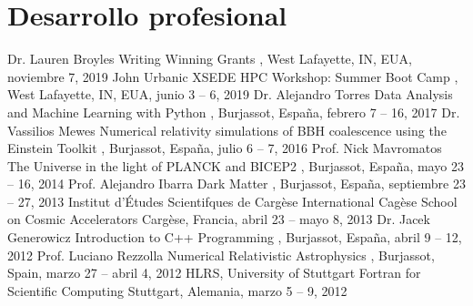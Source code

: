 \section{Desarrollo profesional}

%
{Dr. Lauren Broyles}%
{Writing Winning Grants}%
{}%
{\Purdue, West Lafayette, IN, EUA, noviembre 7, 2019}%
{}
%
{John Urbanic}%
{XSEDE HPC Workshop: Summer Boot Camp}%
{}%
{\Purdue, West Lafayette, IN, EUA, junio 3 -- 6, 2019}%
{}
%
{Dr. Alejandro Torres}%
{Data Analysis and Machine Learning with Python}%
{}%
{\UVval, Burjassot, España, febrero 7 -- 16, 2017}%
{}
%
{Dr. Vassilios Mewes}%
{Numerical relativity simulations of BBH coalescence using the Einstein Toolkit}%
{}%
{\UVval, Burjassot, España, julio 6 -- 7, 2016}%
{}
%
{Prof. Nick Mavromatos}%
{The Universe in the light of PLANCK and BICEP2}%
{}%
{\UVval, Burjassot, España, mayo 23 -- 16, 2014}%
{}
%
{Prof. Alejandro Ibarra}%
{Dark Matter}%
{}%
{\UVval, Burjassot, España, septiembre 23 -- 27, 2013}
{}
%
{Institut d'Études Scientifques de Cargèse}%
{International Cagèse School on Cosmic Accelerators}%
{}%
{Cargèse, Francia, abril 23 -- mayo 8, 2013}%
{}
%
{Dr. Jacek Generowicz}%
{Introduction to C++ Programming}%
{}%
{\UVval, Burjassot, España, abril 9 -- 12, 2012}%
{}
%
{Prof. Luciano Rezzolla}%
{Numerical Relativistic Astrophysics}%
{}%
{\UVval, Burjassot, Spain, marzo 27 -- abril 4, 2012}%
{}
%
{HLRS, University of Stuttgart}%
{Fortran for Scientific Computing}%
{}%
{Stuttgart, Alemania, marzo 5 -- 9, 2012}%
{}
